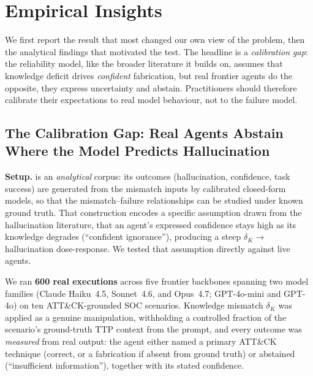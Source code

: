 \section{Empirical Insights}

We first report the result that most changed our own view of the
problem, then the analytical findings that motivated the test. The
headline is a \textit{calibration gap}: the reliability model, like the
broader literature it builds on, assumes that knowledge deficit drives
\textit{confident} fabrication, but real frontier agents do the
opposite, they express uncertainty and abstain. Practitioners should
therefore calibrate their expectations to real model behaviour, not to
the failure model.

\subsection{The Calibration Gap: Real Agents Abstain Where the Model
Predicts Hallucination}

\textbf{Setup.} \SAFK{} is an \textit{analytical} corpus: its outcomes
(hallucination, confidence, task success) are generated from the
mismatch inputs by calibrated closed-form models, so that the
mismatch--failure relationships can be studied under known ground
truth. That construction encodes a specific assumption drawn from the
hallucination literature, that an agent's expressed confidence stays
high as its knowledge degrades (``confident ignorance''), producing a
steep $\delta_K \to$ hallucination dose-response. We tested that
assumption directly against live agents.

We ran \textbf{600 real executions} across five frontier backbones
spanning two model families (Claude Haiku~4.5, Sonnet~4.6, and
Opus~4.7; GPT-4o-mini and GPT-4o) on ten ATT\&CK-grounded SOC
scenarios. Knowledge mismatch $\delta_K$ was applied as a genuine
manipulation, withholding a controlled fraction of the scenario's
ground-truth TTP context from the prompt, and every outcome was
\textit{measured} from real output: the agent either named a primary
ATT\&CK technique (correct, or a fabrication if absent from ground
truth) or abstained (``insufficient information''), together with its
stated confidence.

